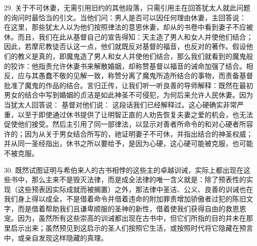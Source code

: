 29. 关于不可休妻，无需引用旧约的其他段落，只需引用主在回答犹太人就此问题的询问时最恰当的引文。当他们问：男人是否可以因任何理由休妻，主回答说： 在这里，那些犹太人以为他们按照律法的意思休妻，却从的书卷中看到妻子不应被休。而且，我们在此从基督自己的宣告得知：天主造了男人和女人并使他们结合；因此，若摩尼教徒否认这一点，他们就既反对基督的福音，也反对的著作。假设他们的教义是真的，即魔鬼造了男人和女人并使他们结合，那么我们就看到的魔鬼般的狡诈：他指责允许休妻书来解散婚姻，却称赞基督以福音的诫命加强了结合。相反，应与其愚蠢不敬的见解一致，称赞分离了魔鬼所造所结合的事物，而责备基督批准了魔鬼的作品的结合。言归正传，让我们听一听良善的导师解释：既然在最初男女的结合中写到婚姻的贞洁是如此神圣不可侵犯，为何后来允许人民休妻。因为当犹太人回答说： 基督对他们说： 这段话我们已经解释过。这心硬确实非常严重，以至于即使通过休书提供了让明智正直的人劝告恢复夫妻之爱的机会，也无法促使他们接受。然后主引用了同一部律法，以显示对善者所命令的和对心硬者所容许的；因为从关于男女结合所写的，祂证明妻子不可休，并指出结合的神圣权威；并从同一圣经指出，休书之所以要给予，是因为心硬，这心硬可能被克服，也可能不被克服。\par

30. 既然试图证明与希伯来人的古书相悖的这些主的卓越训诫，实际上都出现在这些书中，那么主来不是毁灭法律，而是成全法律的唯一含义就是：除了预表性的实现（这些预表因实际成就而被搁置）之外，那法律中圣洁、公义、良善的训诫也在我们身上得以成全，不是借着命令并借着违命的附加罪责增加骄傲者过犯的陈旧文字，而是借着帮助我们且谦卑顺服的圣神的新性，借着使我们获得自由的救恩恩宠。因为，虽然所有这些崇高的训诫都出现在古书中，但它们所指的目的并未在那里启示出来；虽然预见到这启示的圣人们按照它生活，或按照时代将它隐藏在预言中，或亲自发现这样隐藏的真理。\par


